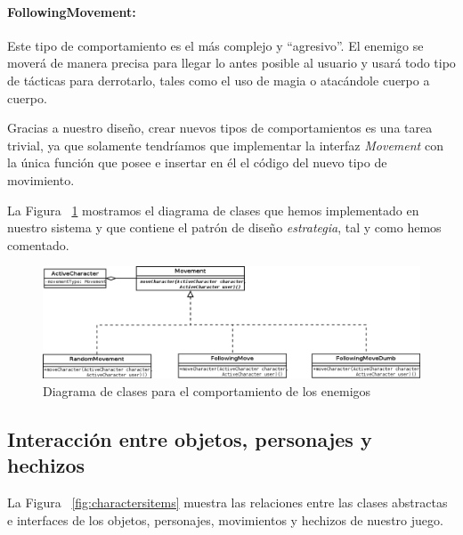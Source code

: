 \paragraph{FollowingMovement:} Este tipo de comportamiento es el más complejo y ``agresivo''. El enemigo se moverá de manera precisa para llegar lo antes posible al usuario y usará todo tipo de tácticas para derrotarlo, tales como el uso de magia o atacándole cuerpo a cuerpo.

\noindent Gracias a nuestro diseño, crear nuevos tipos de comportamientos es una tarea trivial, ya que solamente tendríamos que implementar la interfaz \textit{Movement} con la única función que posee e insertar en él el código del nuevo tipo de movimiento.

La Figura ~\ref{fig:iaenemy} mostramos el diagrama de clases que hemos implementado en nuestro sistema y que contiene el patrón de diseño \textit{estrategia}, tal y como hemos comentado.

\begin{figure}
    \includegraphics[width=\textwidth,height=\textheight,keepaspectratio]{./img/iaenemy.png}
  \caption{Diagrama de clases para el comportamiento de los enemigos}
  \label{fig:iaenemy}
\end{figure}

\subsection{Interacción entre objetos, personajes y hechizos}

La Figura ~\ref{fig:charactersitems} muestra las relaciones entre las clases abstractas e interfaces de los objetos, personajes, movimientos y hechizos de nuestro juego.

